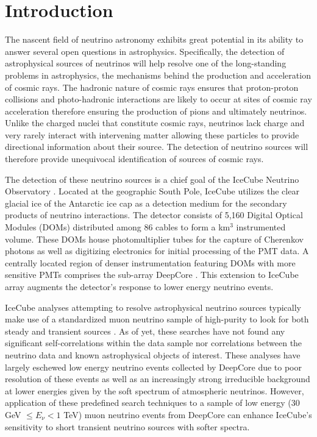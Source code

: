 \documentclass[manuscript]{aastex}
\begin{document}
\section{Introduction}
The nascent field of neutrino astronomy exhibits great potential in its ability to answer several open questions in astrophysics. Specifically, the detection of astrophysical sources of neutrinos will help resolve one of the long-standing problems in astrophysics, the mechanisms behind the production and acceleration of cosmic rays. The hadronic nature of cosmic rays ensures that proton-proton collisions and photo-hadronic interactions are likely to occur at sites of cosmic ray acceleration therefore ensuring the production of pions and ultimately neutrinos. Unlike the charged nuclei that constitute cosmic rays, neutrinos lack charge and very rarely interact with intervening matter allowing these particles to provide directional information about their source. The detection of neutrino sources will therefore provide unequivocal identification of sources of cosmic rays.

The detection of these neutrino sources is a chief goal of the IceCube Neutrino Observatory \citep{2006APh....26..155I}. Located at the geographic South Pole, IceCube utilizes the clear glacial ice of the Antarctic ice cap as a detection medium for the secondary products of neutrino interactions. The detector consists of 5,160 Digital Optical Modules (DOMs) distributed among 86 cables to form a km$^3$ instrumented volume. These DOMs house photomultiplier tubes for the capture of Cherenkov photons as well as digitizing electronics for initial processing of the PMT data. A centrally located region of denser instrumentation featuring DOMs with more sensitive PMTs comprises the sub-array DeepCore \cite{2012APh....35..615A}. This extension to IceCube array augments the detector's response to lower energy neutrino events.

IceCube analyses attempting to resolve astrophysical neutrino sources typically make use of a standardized muon neutrino sample of high-purity to look for both steady \cite{2014ApJ...796..109A} and transient sources \cite{2015arXiv150300598A}. As of yet, these searches have not found any significant self-correlations within the data sample nor correlations between the neutrino data and known astrophysical objects of interest. These analyses have largely eschewed low energy neutrino events collected by DeepCore due to poor resolution of these events as well as an increasingly strong irreducible background at lower energies given by the soft spectrum of atmospheric neutrinos. However, application of these predefined search techniques to a sample of low energy (30 GeV $\leq E_{\nu} < 1$ TeV) muon neutrino events from DeepCore can enhance IceCube's sensitivity to short transient neutrino sources with softer spectra.
\end{document}
